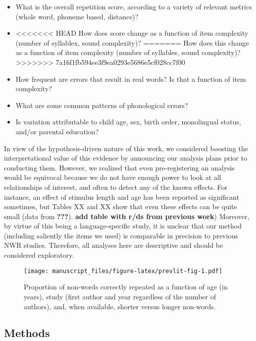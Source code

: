 \documentclass[english,,man,floatsintext]{apa6}
\providecommand{\tightlist}{%
  \setlength{\itemsep}{0pt}\setlength{\parskip}{0pt}}
\begin{document}
\begin{itemize}
\tightlist
\item
  What is the overall repetition score, according to a variety of relevant metrics (whole word, phoneme based, distance)?
\item
<<<<<<< HEAD
  How does score change as a function of item complexity (number of syllablex, sound complexity)?
=======
  How does this change as a function of item complexity (number of syllables, sound complexity)?
>>>>>>> 7a16f1fb594ee3f9ea0293e5686e5cf028cc7f00
\item
  How frequent are errors that result in real words? Is that a function of item complexity?
\item
  What are some common patterns of phonological errors?
\item
  Is variation attributable to child age, sex, birth order, monolingual status, and/or parental education?
\end{itemize}

In view of the hypothesis-driven nature of this work, we considered boosting the interpretational value of this evidence by announcing our analysis plans prior to conducting them. However, we realized that even pre-registering an analysis would be equivocal because we do not have enough power to look at all relationships of interest, and often to detect any of the known effects. For instance, an effect of stimulus length and age has been reported as significant sometimes, but Tables XX and XX show that even these effects can be quite small (data from {\textbf{???}}). \textbf{add table with r/ds from previous work})
Moreover, by virtue of this being a language-specific study, it is unclear that our method (including saliently the items we used) is comparable in precision to previous NWR studies. Therefore, all analyses here are descriptive and should be considered exploratory.

\begin{figure}
\centering
\texttt{[image: manuscript\_files/figure-latex/prevlit-fig-1.pdf]}
\caption{\label{fig:prevlit-fig}Proportion of non-words correctly repeated as a function of age (in years), study (first author and year regardless of the number of authors), and, when available, shorter versus longer non-words.}
\end{figure}

\hypertarget{methods}{%
\subsection{Methods}\label{methods}}
\end{document}
